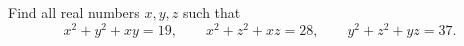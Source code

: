 Find all real numbers $x,y,z$ such that
\[
x^2+y^2+xy=19,\qquad x^2+z^2+xz=28,\qquad y^2+z^2+yz=37 .
\]
